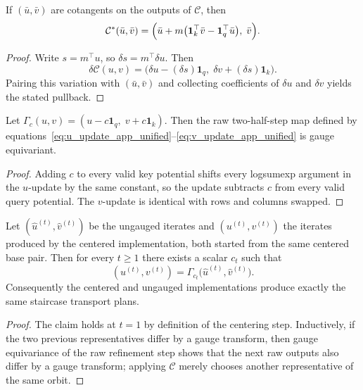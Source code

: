 \begin{lemma}
If $(\bar u,\bar v)$ are cotangents on the outputs of $\mathcal{C}$, then
\[
\mathcal{C}^*(\bar u,\bar v)
=
\Bigl(
\bar u + m\bigl(\mathbf{1}_k^\top \bar v - \mathbf{1}_q^\top \bar u\bigr),
\;
\bar v
\Bigr).
\]
\end{lemma}

\begin{proof}
Write $s=m^\top u$, so $\delta s = m^\top \delta u$. Then
\[
\delta \mathcal{C}(u,v)
=
\bigl(\delta u-(\delta s)\mathbf{1}_q,\; \delta v+(\delta s)\mathbf{1}_k\bigr).
\]
Pairing this variation with $(\bar u,\bar v)$ and collecting coefficients of $\delta u$ and $\delta v$ yields the stated pullback.
\end{proof}

\begin{lemma}
Let $\Gamma_c(u,v)=(u-c\mathbf{1}_q,\; v+c\mathbf{1}_k)$. Then the raw two-half-step map defined by equations~\eqref{eq:u_update_app_unified}--\eqref{eq:v_update_app_unified} is gauge equivariant.
\end{lemma}

\begin{proof}
Adding $c$ to every valid key potential shifts every logsumexp argument in the $u$-update by the same constant, so the update subtracts $c$ from every valid query potential. The $v$-update is identical with rows and columns swapped.
\end{proof}

\begin{proposition}
Let $(\widehat u^{(t)},\widehat v^{(t)})$ be the ungauged iterates and $(u^{(t)},v^{(t)})$ the iterates produced by the centered implementation, both started from the same centered base pair. Then for every $t\ge 1$ there exists a scalar $c_t$ such that
\[
(u^{(t)},v^{(t)})=\Gamma_{c_t}\bigl(\widehat u^{(t)},\widehat v^{(t)}\bigr).
\]
Consequently the centered and ungauged implementations produce exactly the same staircase transport plans.
\end{proposition}

\begin{proof}
The claim holds at $t=1$ by definition of the centering step. Inductively, if the two previous representatives differ by a gauge transform, then gauge equivariance of the raw refinement step shows that the next raw outputs also differ by a gauge transform; applying $\mathcal{C}$ merely chooses another representative of the same orbit.
\end{proof}

